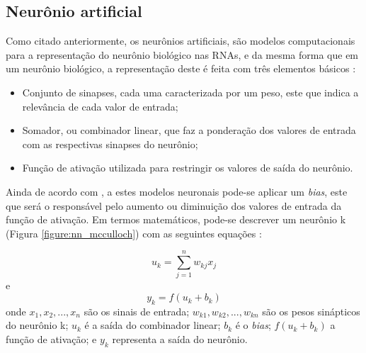 \subsection{Neurônio artificial}

\par Como citado anteriormente, os neurônios artificiais, são modelos computacionais para a representação do neurônio biológico nas RNAs, e da mesma forma que em um neurônio biológico, a representação deste é feita com três elementos básicos \cite{Haykin2001}:  

\begin{itemize}
	\item Conjunto de sinapses, cada uma caracterizada por um peso, este que indica a relevância de cada valor de entrada;
	\item Somador, ou combinador linear, que faz a ponderação dos valores de entrada com as respectivas sinapses do neurônio;
	\item Função de ativação utilizada para restringir os valores de saída do neurônio.
\end{itemize}

\par Ainda de acordo com , a estes modelos neuronais pode-se aplicar um \textit{bias}, este que será o responsável pelo aumento ou diminuição dos valores de entrada da função de ativação. Em termos matemáticos, pode-se descrever um neurônio k (Figura \ref{figure:nn_mcculloch}) com as seguintes equações \cite{Haykin2001}:

\begin{equation}
	u_{k} = \sum_{j=1}^{n} w_{kj} x_{j}
\end{equation}
e
\begin{equation}
	y_{k} = f(u_{k} + b_{k})	
\end{equation}
onde $ x_{1}, x_{2}, ..., x_{n} $ são os sinais de entrada; $ w_{k1}, w_{k2}, ..., w_{kn} $ são os pesos sinápticos do neurônio k; $ u_{k} $ é a saída do combinador linear; $ b_{k} $ é o \textit{bias}; $ f(u_{k} + b_{k}) $ a função de ativação; e $ y_{k} $ representa a saída do neurônio.


